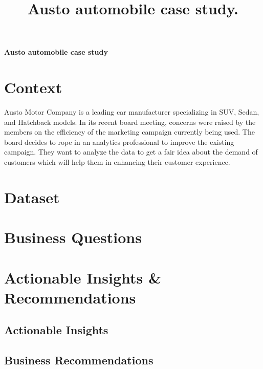\documentclass[12pt,a4paper]{style}
\title{\Large \bf
	Austo automobile case study. %
}
\begin{document}
\tableofcontents
\newpage
\begin{center}
\Large {\bf{Austo automobile case study}}    
\end{center}

	\section{Context}
	Austo Motor Company is a leading car manufacturer specializing in SUV, Sedan, and Hatchback models. In its recent board meeting, concerns were raised by the members on the efficiency of the marketing campaign currently being used. The board decides to rope in an analytics professional to improve the existing campaign. They want to analyze the data to get a fair idea about the demand of customers which will help them in enhancing their customer experience.
	
	\section{Dataset}

    \section{Business Questions}
    \section{Actionable Insights & Recommendations}
    \subsection{Actionable Insights}
    \subsection{Business Recommendations}
\end{document}
